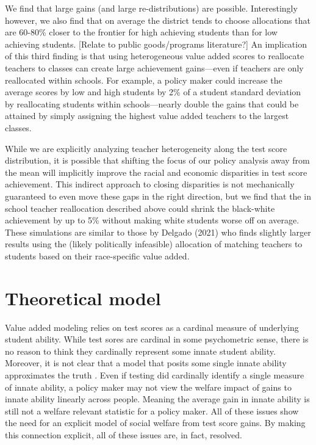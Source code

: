 \documentclass{article}
\theoremstyle{definition}
\theoremstyle{definition}
\theoremstyle{definition}
\begin{document}
We find that large gains (and large re-distributions) are possible. Interestingly however, we also find that on average the district tends to choose allocations that are 60-80\% closer to the frontier for high achieving students than for low achieving students. [Relate to public goods/programs literature?] An implication of this third finding is that using heterogeneous value added scores to reallocate teachers to classes can create large achievement gains—even if teachers are only reallocated within schools. For example, a policy maker could increase the average scores by low and high students by 2\% of a student standard deviation by reallocating students within schools—nearly double the gains that could be attained by simply assigning the highest value added teachers to the largest classes. 

While we are explicitly analyzing teacher heterogeneity along the test score distribution, it is possible that shifting the focus of our policy analysis away from the mean will implicitly improve the racial and economic disparities in test score achievement. This indirect approach to closing disparities is not mechanically guaranteed to even move these gaps in the right direction, but we find that the in school teacher reallocation described above could shrink the black-white achievement by up to 5\% without making white students worse off on average. These simulations are similar to those by Delgado (2021) who finds slightly larger results using the (likely politically infeasible) allocation of matching teachers to students based on their race-specific value added.

\section{Theoretical model}

Value added modeling relies on test scores as a cardinal measure of underlying student ability. While test sores are cardinal in some psychometric sense, there is no reason to think they cardinally represent some innate student ability. Moreover, it is not clear that a model that posits some single innate ability approximates the truth \cite{heckman2022measuring}. Even if testing did cardinally identify a single measure of innate ability, a policy maker may not view the welfare impact of gains to innate ability linearly across people. Meaning the average gain in innate ability is still not a welfare relevant statistic for a policy maker. All of these issues show the need for an explicit model of social welfare from test score gains. By making this connection explicit, all of these issues are, in fact, resolved. 
\end{document}
